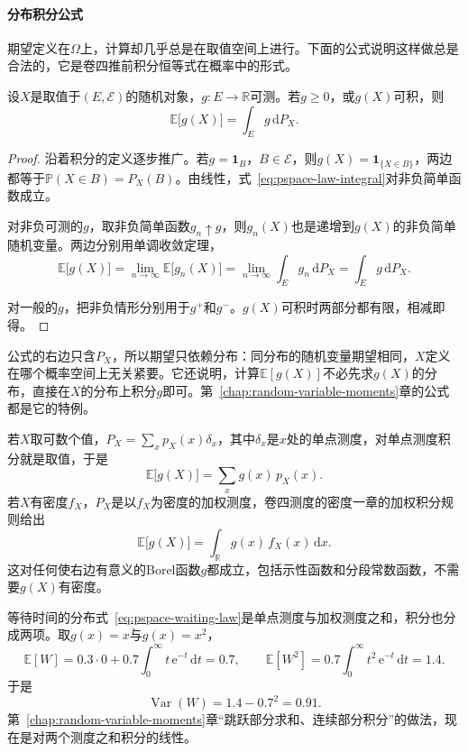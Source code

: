 \paragraph{分布积分公式}
期望定义在$\Omega$上，计算却几乎总是在取值空间上进行。下面的公式说明这样做总是合法的，它是卷四推前积分恒等式在概率中的形式。

\begin{theorem}[分布积分公式]
\label{thm:pspace-law-integral}
设$X$是取值于$(E,\mathcal{E})$的随机对象，$g:E\to\mathbb{R}$可测。若$g\geq0$，或$g(X)$可积，则
\begin{equation}
  \mathbb{E}\bigl[g(X)\bigr]=\int_{E}g\,\mathrm{d}P_X .
  \label{eq:pspace-law-integral}
\end{equation}
\end{theorem}

\begin{proof}
沿着积分的定义逐步推广。若$g=\mathbf{1}_{B}$，$B\in\mathcal{E}$，则$g(X)=\mathbf{1}_{\{X\in B\}}$，两边都等于$\mathbb{P}(X\in B)=P_X(B)$。由线性，式~\eqref{eq:pspace-law-integral}对非负简单函数成立。

对非负可测的$g$，取非负简单函数$g_n\uparrow g$，则$g_n(X)$也是递增到$g(X)$的非负简单随机变量。两边分别用单调收敛定理，
\[
  \mathbb{E}\bigl[g(X)\bigr]=\lim_{n\to\infty}\mathbb{E}\bigl[g_n(X)\bigr]=\lim_{n\to\infty}\int_Eg_n\,\mathrm{d}P_X=\int_Eg\,\mathrm{d}P_X .
\]

对一般的$g$，把非负情形分别用于$g^{+}$和$g^{-}$。$g(X)$可积时两部分都有限，相减即得。
\end{proof}

公式的右边只含$P_X$，所以期望只依赖分布：同分布的随机变量期望相同，$X$定义在哪个概率空间上无关紧要。它还说明，计算$\mathbb{E}[g(X)]$不必先求$g(X)$的分布，直接在$X$的分布上积分$g$即可。第~\ref{chap:random-variable-moments}章的公式都是它的特例。

若$X$取可数个值，$P_X=\sum_xp_X(x)\delta_x$，其中$\delta_x$是$x$处的单点测度，对单点测度积分就是取值，于是
\[
  \mathbb{E}\bigl[g(X)\bigr]=\sum_xg(x)\,p_X(x).
\]
若$X$有密度$f_X$，$P_X$是以$f_X$为密度的加权测度，卷四测度的密度一章的加权积分规则给出
\[
  \mathbb{E}\bigl[g(X)\bigr]=\int_{\mathbb{R}}g(x)\,f_X(x)\,\mathrm{d}x .
\]
这对任何使右边有意义的Borel函数$g$都成立，包括示性函数和分段常数函数，不需要$g(X)$有密度。

等待时间的分布式~\eqref{eq:pspace-waiting-law}是单点测度与加权测度之和，积分也分成两项。取$g(x)=x$与$g(x)=x^{2}$，
\[
  \mathbb{E}[W]=0.3\cdot0+0.7\int_0^{\infty}t\,\mathrm{e}^{-t}\,\mathrm{d}t=0.7,\qquad \mathbb{E}[W^{2}]=0.7\int_0^{\infty}t^{2}\,\mathrm{e}^{-t}\,\mathrm{d}t=1.4 .
\]
于是
\[
  \operatorname{Var}(W)=1.4-0.7^{2}=0.91 .
\]
第~\ref{chap:random-variable-moments}章“跳跃部分求和、连续部分积分”的做法，现在是对两个测度之和积分的线性。

